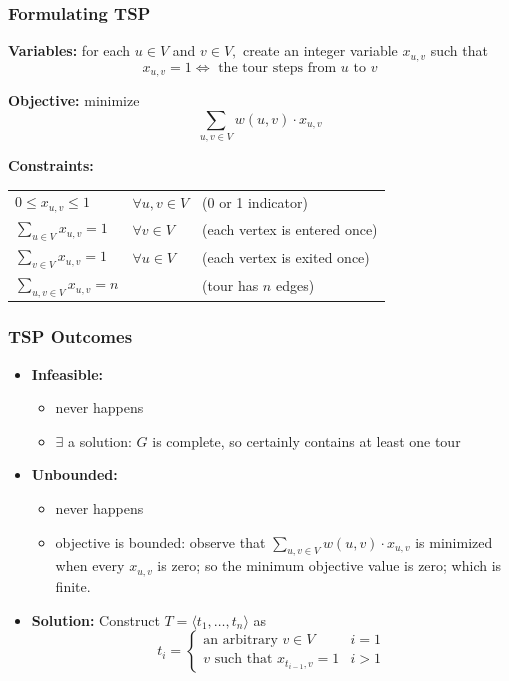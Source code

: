 \documentclass{beamer}
\begin{document}
  \begin{frame} \frametitle{Formulating TSP}
  \textbf{Variables:} for each $u \in V$ and $v \in V,$ create an integer variable $x_{u, v}$ such that
  \[ x_{u,v} = 1 \Leftrightarrow \text{ the tour steps from } u \text{ to } v \]
  
  \textbf{Objective:} minimize
  \[ \sum_{u, v \in V} w(u, v) \cdot x_{u, v} \]
  
  \textbf{Constraints:}
  \begin{tabular}{lll}
    $0 \leq x_{u, v} \leq 1$ & $\forall u, v \in V$ & (0 or 1 indicator) \\
    $\sum_{u \in V} x_{u, v} = 1 $ & $\forall v \in V$ & (each vertex is entered once) \\
    $\sum_{v \in V} x_{u, v} = 1 $ & $\forall u \in V$ & (each vertex is exited once) \\
    $\sum_{u, v \in V} x_{u, v} = n$ & & (tour has $n$ edges) 
  \end{tabular}
  
  \end{frame}
  
  \begin{frame} \frametitle{TSP Outcomes}
    \begin{itemize}
      \item \textbf{Infeasible:}
        \begin{itemize}
        \item never happens
        \item $\exists$ a solution: $G$ is complete, so certainly contains at least one tour
        \end{itemize}
      \item \textbf{Unbounded:}
      \begin{itemize}
        \item never happens
        \item objective is bounded: observe that $\sum_{u, v \in V} w(u, v) \cdot x_{u, v}$
          is minimized when every $x_{u,v}$ is zero; so the minimum objective value is zero; which is finite.
      \end{itemize}
      \item \textbf{Solution:} Construct $T=\langle t_1, \ldots, t_n \rangle$ as
       \[
        t_i =
        \begin{cases}
          \text{an arbitrary } v \in V & i=1 \\
          v \text{ such that } x_{t_{i-1}, v}=1 & i>1 
        \end{cases}
       \]
      \end{itemize}
    \end{frame}
  
\end{document}

